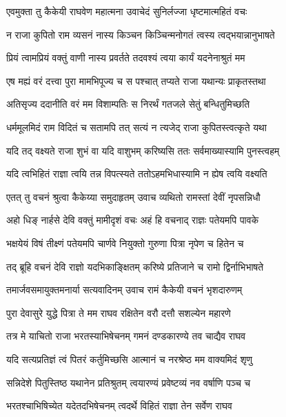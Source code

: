 \twolineshloka
{एवमुक्ता तु कैकेयी राघवेण महात्मना}
{उवाचेदं सुनिर्लज्जा धृष्टमात्महितं वचः} %

\twolineshloka
{न राजा कुपितो राम व्यसनं नास्य किञ्चन}
{किञ्चिन्मनोगतं त्वस्य त्वद्भयान्नानुभाषते} %

\twolineshloka
{प्रियं त्वामप्रियं वक्तुं वाणी नास्य प्रवर्तते}
{तदवश्यं त्वया कार्यं यदनेनाश्रुतं मम} %

\twolineshloka
{एष मह्यं वरं दत्त्वा पुरा मामभिपूज्य च}
{स पश्चात् तप्यते राजा यथान्यः प्राकृतस्तथा} %

\twolineshloka
{अतिसृज्य ददानीति वरं मम विशाम्पतिः}
{स निरर्थं गतजले सेतुं बन्धितुमिच्छति} %

\twolineshloka
{धर्ममूलमिदं राम विदितं च सतामपि}
{तत् सत्यं न त्यजेद् राजा कुपितस्त्वत्कृते यथा} %

\twolineshloka
{यदि तद् वक्ष्यते राजा शुभं वा यदि वाशुभम्}
{करिष्यसि ततः सर्वमाख्यास्यामि पुनस्त्वहम्} %

\twolineshloka
{यदि त्वभिहितं राज्ञा त्वयि तन्न विपत्स्यते}
{ततोऽहमभिधास्यामि न ह्येष त्वयि वक्ष्यति} %

\twolineshloka
{एतत् तु वचनं श्रुत्वा कैकेय्या समुदाहृतम्}
{उवाच व्यथितो रामस्तां देवीं नृपसन्निधौ} %

\twolineshloka
{अहो धिङ् नार्हसे देवि वक्तुं मामीदृशं वचः}
{अहं हि वचनाद् राज्ञः पतेयमपि पावके} %

\twolineshloka
{भक्षयेयं विषं तीक्ष्णं पतेयमपि चार्णवे}
{नियुक्तो गुरुणा पित्रा नृपेण च हितेन च} %

\twolineshloka
{तद् ब्रूहि वचनं देवि राज्ञो यदभिकाङ्क्षितम्}
{करिष्ये प्रतिजाने च रामो द्विर्नाभिभाषते} %

\twolineshloka
{तमार्जवसमायुक्तमनार्या सत्यवादिनम्}
{उवाच रामं कैकेयी वचनं भृशदारुणम्} %

\twolineshloka
{पुरा देवासुरे युद्धे पित्रा ते मम राघव}
{रक्षितेन वरौ दत्तौ सशल्येन महारणे} %

\twolineshloka
{तत्र मे याचितो राजा भरतस्याभिषेचनम्}
{गमनं दण्डकारण्ये तव चाद्यैव राघव} %

\twolineshloka
{यदि सत्यप्रतिज्ञं त्वं पितरं कर्तुमिच्छसि}
{आत्मानं च नरश्रेष्ठ मम वाक्यमिदं शृणु} %

\twolineshloka
{सन्निदेशे पितुस्तिष्ठ यथानेन प्रतिश्रुतम्}
{त्वयारण्यं प्रवेष्टव्यं नव वर्षाणि पञ्च च} %

\twolineshloka
{भरतश्चाभिषिच्येत यदेतदभिषेचनम्}
{त्वदर्थे विहितं राज्ञा तेन सर्वेण राघव} %


